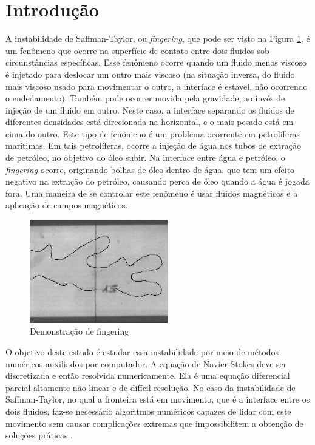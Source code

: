 \documentclass[journal]{IEEEtran}
\begin{document}
%
\IEEEpeerreviewmaketitle

\section{Introdução}
A instabilidade de Saffman-Taylor, ou \textit{fingering}\cite{fingering}, que pode ser visto na Figura \ref{finger}, é um fenômeno que ocorre na superfície de contato entre dois fluidos sob circunstâncias específicas. Esse fenômeno ocorre quando um fluido menos viscoso é injetado para deslocar um outro mais viscoso (na situação inversa, do fluido mais viscoso usado para movimentar o outro, a interface é estavel, não ocorrendo o endedamento). Também pode ocorrer movida pela gravidade, ao invés de injeção de um fluido em outro. Neste caso, a interface separando os fluidos de diferentes densidades está direcionada na horizontal, e o mais pesado está em cima do outro. Este tipo de fenômeno é um problema ocorrente em petrolíferas marítimas. Em tais petrolíferas, ocorre a injeção de água nos tubos de extração de petróleo, no objetivo do óleo subir. Na interface entre água e petróleo, o \textit{fingering} ocorre, originando bolhas de óleo dentro de água, que tem um efeito negativo na extração do petróleo, causando perca de óleo quando a água é jogada fora. Uma maneira de se controlar este fenômeno é usar fluidos magnéticos e a aplicação de campos magnéticos\cite{magnetic_fluids}.
\begin{figure}[!ht]
\centering
\includegraphics[width=6cm]{figures/fingergel.png}
\caption{Demonstração de fingering\label{finger}}
\end{figure}

O objetivo deste estudo é estudar essa instabilidade por meio de métodos numéricos auxiliados por computador. A equação de Navier Stokes deve ser discretizada e então resolvida numericamente. Ela é uma equação diferencial parcial altamente não-linear e de difícil resolução. No caso da instabilidade de Saffman-Taylor, no qual a fronteira está em movimento, que é a interface entre os dois fluidos, faz-se necessário algoritmos numéricos capazes de lidar com este movimento sem causar complicações extremas que impossibilitem a obtenção de soluções práticas\cite{immersed_boundary_methods} \cite{immersed_boundary_methods2}. 
\end{document}
